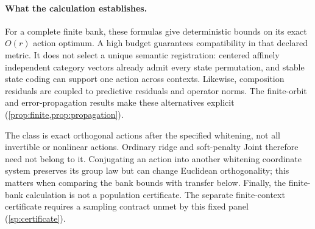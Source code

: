 \paragraph{What the calculation establishes.}
For a complete finite bank, these formulas give deterministic bounds on its exact $O(r)$ action optimum. A high budget guarantees compatibility in that declared metric. It does not select a unique semantic registration: centered affinely independent category vectors already admit every state permutation, and stable state coding can support one action across contexts. Likewise, composition residuals are coupled to predictive residuals and operator norms. The finite-orbit and error-propagation results make these alternatives explicit (\cref{prop:finite,prop:propagation}).

The class is exact orthogonal actions after the specified whitening, not all invertible or nonlinear actions. Ordinary ridge and soft-penalty Joint therefore need not belong to it. Conjugating an action into another whitening coordinate system preserves its group law but can change Euclidean orthogonality; this matters when comparing the bank bounds with transfer below. Finally, the finite-bank calculation is not a population certificate. The separate finite-context certificate requires a sampling contract unmet by this fixed panel (\cref{sp:certificate}).
